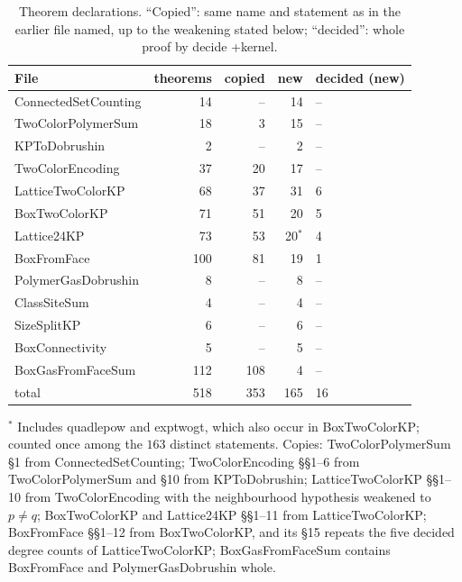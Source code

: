 \documentclass[11pt,a4paper]{article}
\theoremstyle{definition}
\theoremstyle{remark}
\DeclareRobustCommand{\lean}[1]{{\ttfamily\renewcommand{\_}{\textunderscore\allowbreak}#1}}
\begin{document}
\begin{table}[ht]\centering\small
\caption{Theorem declarations. ``Copied'': same name and statement as in the earlier file named, up to the weakening stated below; ``decided'': whole proof \lean{by decide +kernel}.}\label{tab:count}
\begin{tabular}{@{}lrrrl@{}}\toprule
File & theorems & copied & new & decided (new)\\\midrule
\lean{ConnectedSetCounting} & 14 & -- & 14 & --\\
\lean{TwoColorPolymerSum} & 18 & 3 & 15 & --\\
\lean{KPToDobrushin} & 2 & -- & 2 & --\\
\lean{TwoColorEncoding} & 37 & 20 & 17 & --\\
\lean{LatticeTwoColorKP} & 68 & 37 & 31 & 6\\
\lean{BoxTwoColorKP} & 71 & 51 & 20 & 5\\
\lean{Lattice24KP} & 73 & 53 & 20$^{*}$ & 4\\
\lean{BoxFromFace} & 100 & 81 & 19 & 1\\
\lean{PolymerGasDobrushin} & 8 & -- & 8 & --\\
\lean{ClassSiteSum} & 4 & -- & 4 & --\\
\lean{SizeSplitKP} & 6 & -- & 6 & --\\
\lean{BoxConnectivity} & 5 & -- & 5 & --\\
\lean{BoxGasFromFaceSum} & 112 & 108 & 4 & --\\\midrule
total & 518 & 353 & 165 & 16\\\bottomrule
\end{tabular}
\par\smallskip\raggedright\footnotesize $^{*}$ Includes \lean{quad\_le\_pow} and \lean{exp\_two\_gt}, which also occur in \lean{BoxTwoColorKP}; counted once among the $163$ distinct statements. Copies: \lean{TwoColorPolymerSum} \S1 from \lean{ConnectedSetCounting}; \lean{TwoColorEncoding} \S\S1--6 from \lean{TwoColorPolymerSum} and \S10 from \lean{KPToDobrushin}; \lean{LatticeTwoColorKP} \S\S1--10 from \lean{TwoColorEncoding} with the neighbourhood hypothesis weakened to $p\ne q$; \lean{BoxTwoColorKP} and \lean{Lattice24KP} \S\S1--11 from \lean{LatticeTwoColorKP}; \lean{BoxFromFace} \S\S1--12 from \lean{BoxTwoColorKP}, and its \S15 repeats the five decided degree counts of \lean{LatticeTwoColorKP}; \lean{BoxGasFromFaceSum} contains \lean{BoxFromFace} and \lean{PolymerGasDobrushin} whole.
\end{table}
\end{document}
